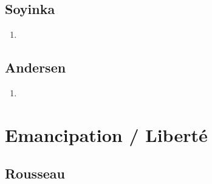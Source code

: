 \documentclass[a4paper, 11pt, hidelinks]{article}
\begin{document}
\subsection{Soyinka}


\begin{enumerate}
    \item 
\end{enumerate}




\subsection{Andersen}


\begin{enumerate}
    \item 
\end{enumerate}


































\section{Emancipation / Liberté}



\subsection{Rousseau}
\end{document}
